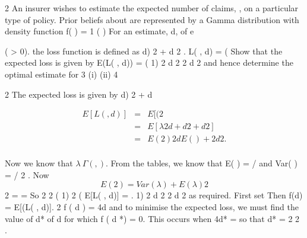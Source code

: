 \documentclass[a4paper,12pt]{article}
\begin{document}
2 An insurer wishes to estimate the expected number of claims, , on a particular type
of policy. Prior beliefs about are represented by a Gamma distribution with density
function
f( ) =
1
( )
For an estimate, d, of
e

( > 0).
the loss function is defined as
d) 2 + d 2 .
L( , d) = (
Show that the expected loss is given by
E(L( , d)) =
(
1)
2 d
2
2 d 2
and hence determine the optimal estimate for
3
(i)
(ii)
4


2%
The expected loss is given by
d) 2 + d %

\begin{eqnarray*}
E[L( , d)] &=& E[(
2 \\
&=& E[ \lambda 
2 d + d 2 + d 2 ]\\
&=& E( 2 )
2dE( ) + 2d 2 .\\
\end{eqnarray*}

Now we know that $ \lambda ~ \Gamma ( , )$. From the tables, we know that E( ) = / and
Var( ) = / 2 . Now
\[E( 2 ) = Var(\lambda ) + E(\lambda ) 2\]
2
=
=
So
2 2
( 1)
2
(
E[L( , d)] =
.
1)
2 d
2
2 d 2
as required.
First set
Then
f(d) = E[(L( , d)].
2
f ( d ) =
4d
and to minimise the expected loss, we must find the value of d* of d for which
f ( d *) = 0. This occurs when
4d* =
so that
d* =
2
2
.
\end{document}
